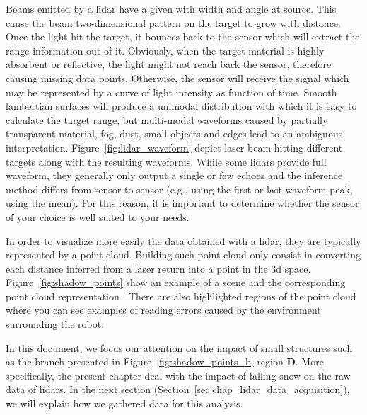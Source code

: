 Beams emitted by a \gls*{lidar} have a given with width and angle at source. This cause the beam two-dimensional pattern on the target to grow with distance. Once the light hit the target, it bounces back to the sensor which will extract the range information out of it. Obviously, when the target material is highly absorbent or reflective, the light might not reach back the sensor, therefore causing missing data points. Otherwise, the sensor will receive the signal which may be represented by a curve of light intensity as function of time. Smooth lambertian surfaces will produce a unimodal distribution with which it is easy to calculate the target range, but multi-modal waveforms caused by partially transparent material, fog, dust, small objects and edges lead to an ambiguous interpretation. Figure~\ref{fig:lidar_waveform} depict laser beam hitting different targets along with the resulting waveforms. While some \gls*{lidar}s provide full waveform, they generally only output a single or few echoes and the inference method differs from sensor to sensor (e.g., using the first or last waveform peak, using the mean). For this reason, it is important to determine whether the sensor of your choice is well suited to your needs. 

In order to visualize more easily the data obtained with a lidar, they are typically represented by a point cloud. Building such point cloud only consist in converting each distance inferred from a laser return into a point in the \gls*{3d} space. Figure~\ref{fig:shadow_points} show an example of a scene  and the corresponding point cloud representation . There are also highlighted regions of the point cloud where you can see examples of reading errors caused by the environment surrounding the robot. 

In this document, we focus our attention on the impact of small structures such as the branch presented in Figure~\ref{fig:shadow_points_b} region \textbf{D}. More specifically, the present chapter deal with the impact of falling snow on the raw data of \gls*{lidar}s. In the next section (Section~\ref{sec:chap_lidar_data_acquisition}), we will explain how we gathered data for this analysis.

